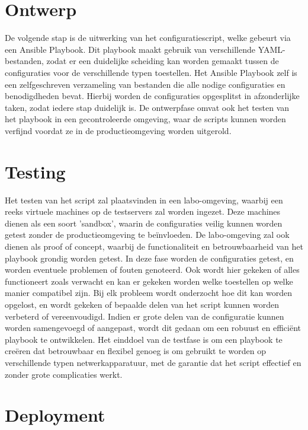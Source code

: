 \section{Ontwerp}
\label{sec:ontwerp}

De volgende stap is de uitwerking van het configuratiescript, welke gebeurt via een Ansible Playbook. 
Dit playbook maakt gebruik van verschillende YAML-bestanden, zodat er een duidelijke scheiding kan worden gemaakt tussen de configuraties voor de verschillende typen toestellen. 
Het Ansible Playbook zelf is een zelfgeschreven verzameling van bestanden die alle nodige configuraties en benodigdheden bevat. 
Hierbij worden de configuraties opgesplitst in afzonderlijke taken, zodat iedere stap duidelijk is. 
De ontwerpfase omvat ook het testen van het playbook in een gecontroleerde omgeving, waar de scripts kunnen worden verfijnd voordat ze in de productieomgeving worden uitgerold.

\section{Testing}
\label{sec:testing}

Het testen van het script zal plaatsvinden in een labo-omgeving, waarbij een reeks virtuele machines op de testservers zal worden ingezet. 
Deze machines dienen als een soort 'sandbox', waarin de configuraties veilig kunnen worden getest zonder de productieomgeving te beïnvloeden. 
De labo-omgeving zal ook dienen als proof of concept, waarbij de functionaliteit en betrouwbaarheid van het playbook grondig worden getest.
In deze fase worden de configuraties getest, en worden eventuele problemen of fouten genoteerd. 
Ook wordt hier gekeken of alles functioneert zoals verwacht en kan er gekeken worden welke toestellen op welke manier compatibel zijn. 
Bij elk probleem wordt onderzocht hoe dit kan worden opgelost, en wordt gekeken of bepaalde delen van het script kunnen worden verbeterd of vereenvoudigd. 
Indien er grote delen van de configuratie kunnen worden samengevoegd of aangepast, wordt dit gedaan om een robuust en efficiënt playbook te ontwikkelen.
Het einddoel van de testfase is om een playbook te creëren dat betrouwbaar en flexibel genoeg is om gebruikt te worden op verschillende typen netwerkapparatuur, 
met de garantie dat het script effectief en zonder grote complicaties werkt.

\section{Deployment}
\label{sec:deployment}


